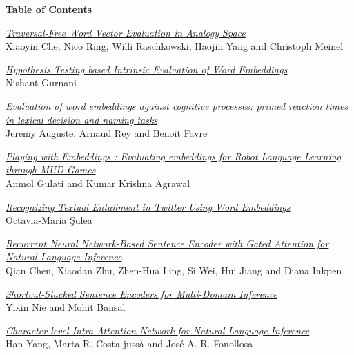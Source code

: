 \setlength{\parindent}{0in}
\setlength{\parskip}{2ex}

\begin{center}
  {\Large \bf Table of Contents}
\end{center}

\vspace*{0.5cm}
\hyperlink{page.1}{\em Traversal-Free Word Vector Evaluation in Analogy Space}\samepage \\
\hspace*{7mm} Xiaoyin Che, Nico Ring, Willi Raschkowski, Haojin Yang and Christoph Meinel\dotfill {}

\hyperlink{page.6}{\em Hypothesis Testing based Intrinsic Evaluation of Word Embeddings}\samepage \\
\hspace*{7mm} Nishant Gurnani\dotfill {}

\hyperlink{page.11}{\em Evaluation of word embeddings against cognitive processes: primed reaction times in lexical decision and naming tasks}\samepage \\
\hspace*{7mm} Jeremy Auguste, Arnaud Rey and Benoit Favre\dotfill {}

\hyperlink{page.17}{\em Playing with Embeddings : Evaluating embeddings for Robot Language Learning through MUD Games}\samepage \\
\hspace*{7mm} Anmol Gulati and Kumar Krishna Agrawal\dotfill {}

\hyperlink{page.21}{\em Recognizing Textual Entailment in Twitter Using Word Embeddings}\samepage \\
\hspace*{7mm} Octavia-Maria \c{S}ulea\dotfill {}

\hyperlink{page.26}{\em Recurrent Neural Network-Based Sentence Encoder with Gated Attention for Natural Language Inference}\samepage \\
\hspace*{7mm} Qian Chen, Xiaodan Zhu, Zhen-Hua Ling, Si Wei, Hui Jiang and Diana Inkpen\dotfill {}

\hyperlink{page.31}{\em Shortcut-Stacked Sentence Encoders for Multi-Domain Inference}\samepage \\
\hspace*{7mm} Yixin Nie and Mohit Bansal\dotfill {}

\hyperlink{page.36}{\em Character-level Intra Attention Network for Natural Language Inference}\samepage \\
\hspace*{7mm} Han Yang, Marta R. Costa-juss\`{a} and Jos\'{e} A. R. Fonollosa\dotfill {}

